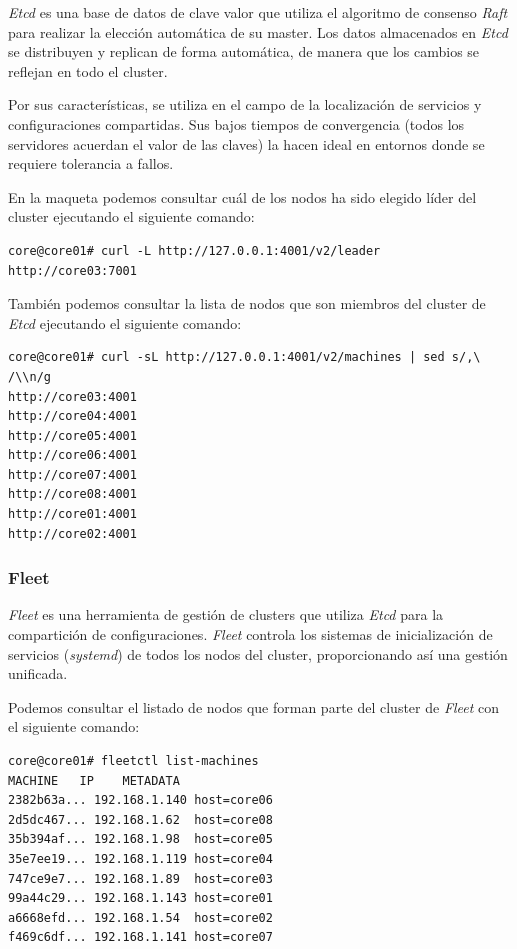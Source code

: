 \documentclass[a4paper,12pt,spanish,final]{epsc_tfc_pfc}
\begin{document}
\emph{Etcd} es una base de datos de clave valor que utiliza el algoritmo de consenso \emph{Raft} para realizar la elección automática de su master. Los datos almacenados en \emph{Etcd} se distribuyen y replican de forma automática, de manera que los cambios se reflejan en todo el cluster.

Por sus características, se utiliza en el campo de la localización de servicios y configuraciones compartidas. Sus bajos tiempos de convergencia (todos los servidores acuerdan el valor de las claves) la hacen ideal en entornos donde se requiere tolerancia a fallos.

En la maqueta podemos consultar cuál de los nodos ha sido elegido líder del cluster ejecutando el siguiente comando:\\

\begin{lstlisting}[style=dnsmasq]
core@core01# curl -L http://127.0.0.1:4001/v2/leader
http://core03:7001
\end{lstlisting}

También podemos consultar la lista de nodos que son miembros del cluster de \emph{Etcd} ejecutando el siguiente comando:\\

\begin{lstlisting}[style=dnsmasq]
core@core01# curl -sL http://127.0.0.1:4001/v2/machines | sed s/,\ /\\n/g
http://core03:4001
http://core04:4001
http://core05:4001
http://core06:4001
http://core07:4001
http://core08:4001
http://core01:4001
http://core02:4001
\end{lstlisting}

\subsubsection{Fleet}

\emph{Fleet} es una herramienta de gestión de clusters que utiliza \emph{Etcd} para la compartición de configuraciones. \emph{Fleet} controla los sistemas de inicialización de servicios (\emph{systemd}) de todos los nodos del cluster, proporcionando así una gestión unificada.

Podemos consultar el listado de nodos que forman parte del cluster de \emph{Fleet} con el siguiente comando:\\

\begin{lstlisting}[style=dnsmasq]
core@core01# fleetctl list-machines
MACHINE   IP    METADATA
2382b63a... 192.168.1.140 host=core06
2d5dc467... 192.168.1.62  host=core08
35b394af... 192.168.1.98  host=core05
35e7ee19... 192.168.1.119 host=core04
747ce9e7... 192.168.1.89  host=core03
99a44c29... 192.168.1.143 host=core01
a6668efd... 192.168.1.54  host=core02
f469c6df... 192.168.1.141 host=core07
\end{lstlisting}
\end{document}
